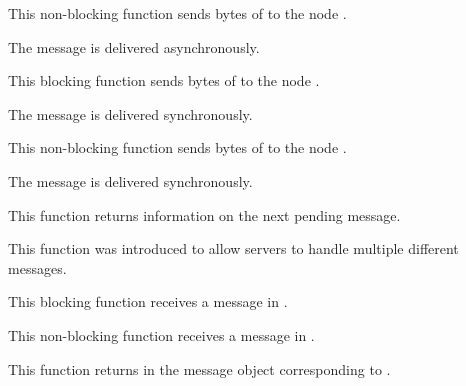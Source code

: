 	 {
	   This non-blocking function sends  bytes of
	    to the node .

	   The message is delivered asynchronously.
	 }

	 {
	   This blocking function sends  bytes of
	    to the node .

	   The message is delivered synchronously.
	 }

	 {
	   This non-blocking function sends  bytes of
	    to the node .

	   The message is delivered synchronously.
	 }

	 {
	   This function returns information on the next pending message.

	   This function was introduced to allow servers to handle
	   multiple different messages.
	 }

	 {
	   This blocking function receives a message in .
	 }

	 {
	   This non-blocking function receives a message in .
	 }

	 {
	   This function returns in  the message object
	   corresponding to .
	 }

